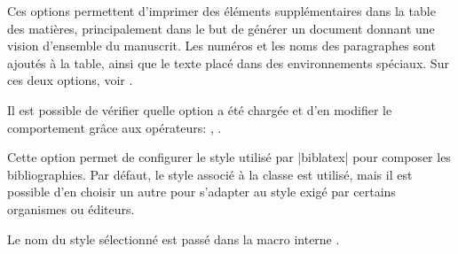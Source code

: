 \begin{noprint}
\end{noprint}

Ces options permettent d'imprimer des éléments supplémentaires dans la table des matières, principalement dans le but de générer un document donnant une vision d'ensemble du manuscrit. Les numéros et les noms des paragraphes sont ajoutés à la table, ainsi que le texte placé dans des environnements spéciaux. Sur ces deux options, voir .

\begin{developer}
Il est possible de vérifier quelle option a été chargée et d'en modifier le comportement grâce aux opérateurs: , .
\end{developer}

\begin{noprint}
\end{noprint}

Cette option permet de configurer le style utilisé par |biblatex| pour composer les bibliographies. Par défaut, le style associé à la classe \frenchlaw est utilisé, mais il est possible d'en choisir un autre pour s'adapter au style exigé par certains organismes ou éditeurs.

\begin{developer}
Le nom du style sélectionné est passé dans la macro interne .
\end{developer}

